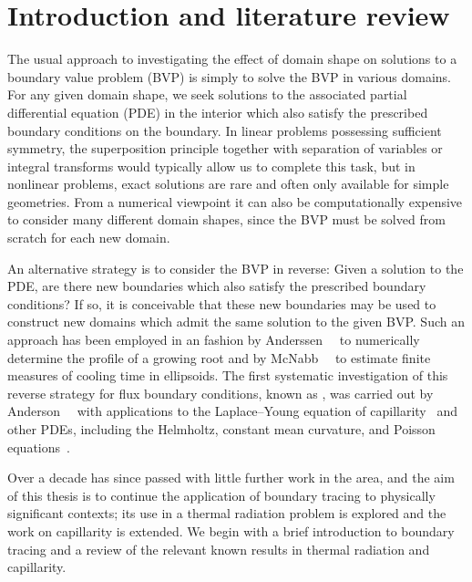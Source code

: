 \chapter{Introduction and literature review}
\label{ch:introduction}

The usual approach
to investigating the effect of domain shape
on solutions to a boundary value problem (BVP)
is simply to solve the BVP in various domains.
For any given domain shape, we seek solutions
to the associated partial differential equation (PDE) in the interior
which also satisfy the prescribed boundary conditions on the boundary.
In linear problems possessing sufficient symmetry,
the superposition principle
together with separation of variables or integral transforms
would typically allow us to complete this task,
but in nonlinear problems,
exact solutions are rare and often only available for simple geometries.
From a numerical viewpoint
it can also be computationally expensive
to consider many different domain shapes,
since the BVP must be solved from scratch for each new domain.

An alternative strategy is to
consider the BVP in reverse:
Given a solution to the PDE\@, are there new boundaries
which also satisfy the prescribed boundary conditions?
If so, it is conceivable that these new boundaries may be used
to construct new domains
which admit the same solution to the given BVP\@.
Such an approach has been employed in an \adhoc{} fashion
by Anderssen~\etal~\cite{anderssen-1969-ion-uptake-growing-roots}
to numerically determine the profile of a growing root
and by McNabb~\etal~\cite{mcnabb-1991-theoretical-derivation-freezing-times}
to estimate finite measures of cooling time in ellipsoids.
The first systematic investigation of this
reverse strategy for flux boundary conditions,
known as ,
was carried out by
Anderson~\etal~\cite{anderson-2007-boundary-tracing-i-theory}
with applications to the Laplace--Young equation
of capillarity~\cite{anderson-2006-exact-solutions-laplace-young}
and other PDEs, including the Helmholtz,
constant mean curvature, and
Poisson equations~\cite{anderson-2007-boundary-tracing-ii-applications}.

Over a decade has since passed
with little further work in the area,
and the aim of this thesis is to
continue the application of boundary tracing
to physically significant contexts;
its use in a thermal radiation problem is explored
and the work on capillarity is extended.
We begin with a brief introduction to boundary tracing
and a review of the relevant known results
in thermal radiation and capillarity.

